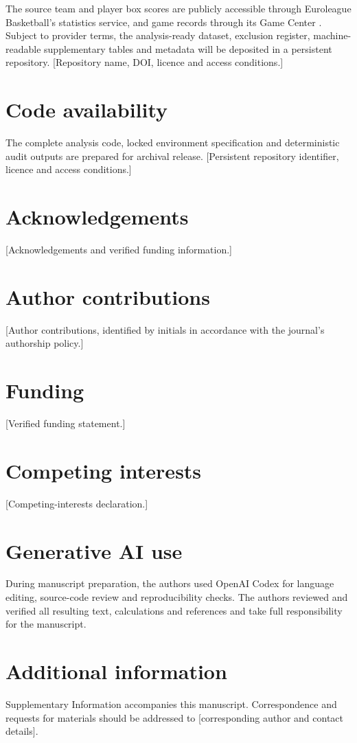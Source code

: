 \documentclass[pdflatex,sn-mathphys-num]{sn-jnl}
\begin{document}
The source team and player box scores are publicly accessible through Euroleague Basketball's statistics service, and game records through its Game Center \cite{euroleagueStats,EuroleagueGameCenter2026}. Subject to provider terms, the analysis-ready dataset, exclusion register, machine-readable supplementary tables and metadata will be deposited in a persistent repository. [Repository name, DOI, licence and access conditions.]

\section{Code availability}

The complete analysis code, locked environment specification and deterministic audit outputs are prepared for archival release. [Persistent repository identifier, licence and access conditions.]

\section{Acknowledgements}

[Acknowledgements and verified funding information.]

\section{Author contributions}

[Author contributions, identified by initials in accordance with the journal's authorship policy.]

\section{Funding}

[Verified funding statement.]

\section{Competing interests}

[Competing-interests declaration.]

\section{Generative AI use}

During manuscript preparation, the authors used OpenAI Codex for language editing, source-code review and reproducibility checks. The authors reviewed and verified all resulting text, calculations and references and take full responsibility for the manuscript.

\section{Additional information}

Supplementary Information accompanies this manuscript. Correspondence and requests for materials should be addressed to [corresponding author and contact details].


\end{document}
